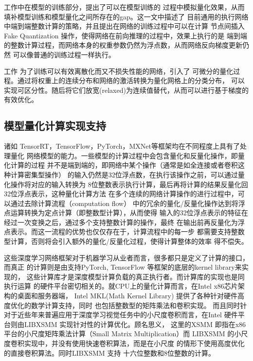 工作\cite{Jacob2017QuantizationAT}中在模型的训练部分，提出了可以在模型训练的
过程中模拟量化效果，从而填补模型训练和模型量化之间所存在的gap。这一文中描述了
目前通用的执行网络中端到端整数计算的策略，并且提出在网络的训练过程中可以在计算
节点间插入 Fake Quantization 操作，使得网络在前向推理的过程中，效果上执行的是
端到端的整数计算过程，而网络本身的权重参数仍然为浮点数，从而网络反向梯度更新仍然
可以像普通的训练过程一样执行。

工作\cite{Louizos2019RelaxedQF} 为了训练可以有效离散化而又不损失性能的网络，引入了
可微分的量化过程。通过将权重上的连续分布和网络的激活转换为量化网格上的分类分布，
可以实现可区分性。随后将它们放宽(relaxed)为连续值替代，从而可以进行基于梯度的
有效优化。

\subsection{模型量化计算实现支持}

诸如 TensorRT，TensorFlow，PyTorch，MXNet等框架均在不同程度上具有了处理量化
网络模型的能力。一些模型的计算过程中会包含量化和反量化操作，即量化计算的过程
并不是端到端的，即网络中某个操作（通常是如全连接或者卷积这种计算密集型操作）
的输入仍然是32位浮点数，在执行该操作之前，可以通过量化操作将对应的输入转换为
8位整数表示执行计算，最后再将计算的结果反量化回32位浮点表示，这种量化计算方法
在多个连续的网络计算操作的进行过程中，可以通过去除计算流程（computation flow）
中的冗余的量化/反量化操作达到将浮点运算转换为定点计算（即整数型计算），从而使得
输入的32位浮点表示的特征在经过一次变换之后，通过多个支持整数计算的操作，最终
在输出前再反量化为浮点表示。而这一流程的优势也仅仅存在于，计算流程中的每一步
都需要支持整数型计算，否则将会引入额外的量化/反量化过程，使得计算整体的效率
得不偿失。

这些深度学习网络框架对于机器学习从业者而言，很多都只是定义了计算的接口，而真正
的计算则是由支持PyTorch, TensorFlow 等框架的底层的kernel library来实现的，
这些计算库才是深度模型计算负载的真正执行者。而计算库的实现也是同执行运算
的硬件平台密切相关的。就CPU上的量化计算而言，在Intel x86芯片架构的桌面和服务器端，
Intel MKL(Math Kernel Library) 提供了各种针对硬件高度优化的数学计算支持，同时
也包括整数型的矩阵乘法和卷积实现。
而且同时针对于近些年来普遍应用于深度学习视觉任务中的小尺度卷积而言，在Intel
硬件平台则由LIBXSMM\cite{Heinecke2016LIBXSMMAS} 实现针对性的计算优化。顾名思义，
这里的XSMM 即指在x86 平台的小尺度矩阵乘法计算（Small Matrix Multiplication）而
LIBXSMM 的小尺度卷积实现中，并没有使用快速卷积算法，而是在小尺度
的情形下使用高度优化的直接卷积算法。同时LIBXSMM 支持 十六位整数和8位整数的计算。

